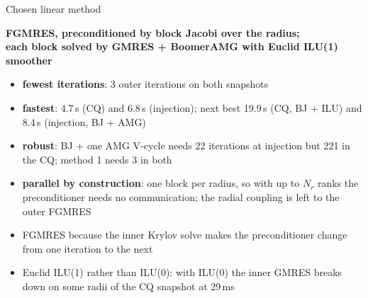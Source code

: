 \begin{frame}{Chosen linear method}
    \begin{center}
        \textbf{FGMRES, preconditioned by block Jacobi over the radius;}\\
        \textbf{each block solved by GMRES + BoomerAMG with Euclid ILU(1) smoother}
    \end{center}
    \vspace{0.5em}
    \small
    \begin{itemize}
        \item \textbf{fewest iterations}: 3 outer iterations on both snapshots
        \item \textbf{fastest}: 4.7\,s (CQ) and 6.8\,s (injection);
              next best 19.9\,s (CQ, BJ + ILU) and 8.4\,s (injection, BJ + AMG)
        \item \textbf{robust}: BJ + one AMG V-cycle needs 22 iterations at injection but 221 in the CQ;
              method 1 needs 3 in both
        \item \textbf{parallel by construction}: one block per radius, so with up to $N_r$ ranks
              the preconditioner needs no communication; the radial coupling is left to the outer FGMRES
        \item FGMRES because the inner Krylov solve makes the preconditioner change from one iteration to the next
        \item Euclid ILU(1) rather than ILU(0): with ILU(0) the inner GMRES breaks down on
              some radii of the CQ snapshot at 29\,ms
    \end{itemize}
\end{frame}

